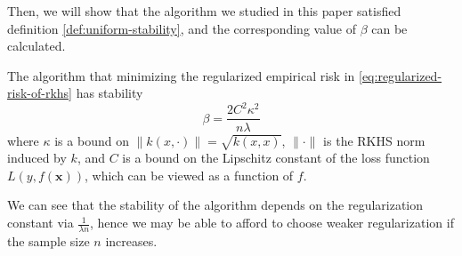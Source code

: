 Then, we will show that the algorithm we studied in this paper satisfied definition \ref{def:uniform-stability}, and the corresponding value of $\beta$ can be calculated.

\begin{theorem}
	\label{thm:algorithmic-stability-of-risk-minimizers}
	The algorithm that minimizing the regularized empirical risk in \eqref{eq:regularized-risk-of-rkhs} has stability
	\begin{equation}
		\beta=\frac{2C^{2}\kappa^{2}}{n\lambda}
	\end{equation}
	where $\kappa$ is a bound on $\|k(x,\cdot)\|=\sqrt{k(x,x)}$, $\|\cdot\|$ is the RKHS norm induced by $k$, and $C$ is a bound on the Lipschitz constant of the loss function $L\left(y,f(\mathbf{x})\right)$, which can be viewed as a function of $f$.
\end{theorem}

\begin{remark}
	We can see that the stability of the algorithm depends on the regularization constant via $\frac{1}{\lambda n}$, hence we may be able to afford to choose weaker regularization if the sample size $n$ increases.
\end{remark}

